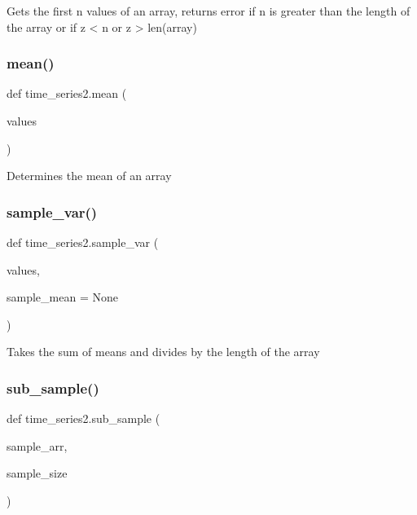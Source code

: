 \begin{DoxyVerb}Gets the first n values of an array, returns error if n is greater than the length of the array or if z < n or z > len(array)\end{DoxyVerb}
 \mbox{\label{namespacetime__series2_a91a50d414e62104b3c4df302683fa374}} 
\subsubsection{\texorpdfstring{mean()}{mean()}}
{\footnotesize\ttfamily def time\+\_\+series2.\+mean (\begin{DoxyParamCaption}\item[{}]{values }\end{DoxyParamCaption})}

\begin{DoxyVerb}Determines the mean of an array\end{DoxyVerb}
 \mbox{\label{namespacetime__series2_a2fb326ca63610119cde08d76b52599fe}} 
\subsubsection{\texorpdfstring{sample\+\_\+var()}{sample\_var()}}
{\footnotesize\ttfamily def time\+\_\+series2.\+sample\+\_\+var (\begin{DoxyParamCaption}\item[{}]{values,  }\item[{}]{sample\+\_\+mean = {\ttfamily None} }\end{DoxyParamCaption})}

\begin{DoxyVerb}Takes the sum of means and divides by the length of the array\end{DoxyVerb}
 \mbox{\label{namespacetime__series2_ab7308a3396727b46466322d617ea0af5}} 
\subsubsection{\texorpdfstring{sub\+\_\+sample()}{sub\_sample()}}
{\footnotesize\ttfamily def time\+\_\+series2.\+sub\+\_\+sample (\begin{DoxyParamCaption}\item[{}]{sample\+\_\+arr,  }\item[{}]{sample\+\_\+size }\end{DoxyParamCaption})}

